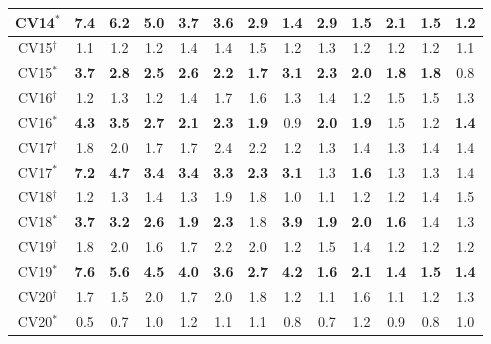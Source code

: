 \begin{table}[]
\begin{threeparttable}
\begin{tabular}{c|cccccc|cccccc}
CV14$^{*}$&\textbf{7.4} &\textbf{6.2} &\textbf{5.0} &\textbf{3.7} &\textbf{3.6} &\textbf{2.9} &\textbf{1.4} &\textbf{2.9} &1.5 &\textbf{2.1} &\textbf{1.5} &1.2 \\
\hline
CV15$^{\dag}$&1.1 &1.2 &1.2 &1.4 &1.4 &1.5 &1.2 &1.3 &1.2 &1.2 &1.2 &1.1 \\
CV15$^{*}$&\textbf{3.7} &\textbf{2.8} &\textbf{2.5} &\textbf{2.6} &\textbf{2.2} &\textbf{1.7} &\textbf{3.1} &\textbf{2.3} &\textbf{2.0} &\textbf{1.8} &\textbf{1.8} &0.8 \\
\hline
CV16$^{\dag}$&1.2 &1.3 &1.2 &1.4 &1.7 &1.6 &1.3 &1.4 &1.2 &1.5 &1.5 &1.3 \\
CV16$^{*}$&\textbf{4.3} &\textbf{3.5} &\textbf{2.7} &\textbf{2.1} &\textbf{2.3} &\textbf{1.9} &0.9 &\textbf{2.0} &\textbf{1.9} &1.5 &1.2 &\textbf{1.4} \\
\hline
CV17$^{\dag}$&1.8 &2.0 &1.7 &1.7 &2.4 &2.2 &1.2 &1.3 &1.4 &1.3 &1.4 &1.4 \\
CV17$^{*}$&\textbf{7.2} &\textbf{4.7} &\textbf{3.4} &\textbf{3.4} &\textbf{3.3} &\textbf{2.3} &\textbf{3.1} &1.3 &\textbf{1.6} &1.3 &1.3 &1.4 \\
\hline
CV18$^{\dag}$&1.2 &1.3 &1.4 &1.3 &1.9 &1.8 &1.0 &1.1 &1.2 &1.2 &1.4 &1.5 \\
CV18$^{*}$&\textbf{3.7} &\textbf{3.2} &\textbf{2.6} &\textbf{1.9} &\textbf{2.3} &1.8 &\textbf{3.9} &\textbf{1.9} &\textbf{2.0} &\textbf{1.6} &1.4 &1.3 \\
\hline
CV19$^{\dag}$&1.8 &2.0 &1.6 &1.7 &2.2 &2.0 &1.2 &1.5 &1.4 &1.2 &1.2 &1.2 \\
CV19$^{*}$&\textbf{7.6} &\textbf{5.6} &\textbf{4.5} &\textbf{4.0} &\textbf{3.6} &\textbf{2.7} &\textbf{4.2} &\textbf{1.6} &\textbf{2.1} &\textbf{1.4} &\textbf{1.5} &\textbf{1.4} \\
\hline
CV20$^{\dag}$&1.7 &1.5 &2.0 &1.7 &2.0 &1.8 &1.2 &1.1 &1.6 &1.1 &1.2 &1.3 \\
CV20$^{*}$&0.5 &0.7 &1.0 &1.2 &1.1 &1.1 &0.8 &0.7 &1.2 &0.9 &0.8 &1.0 \\

\bottomrule
\end{tabular}
\end{threeparttable}
\end{table}




%	


